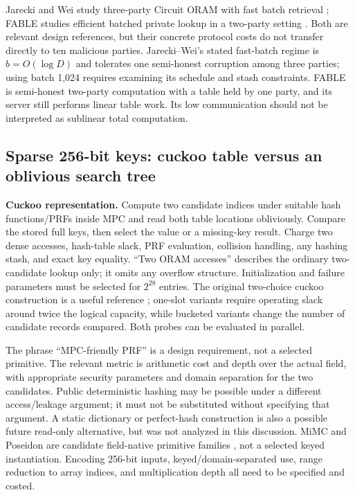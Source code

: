 \documentclass[11pt]{article}
\begin{document}
Jarecki and Wei study three-party Circuit ORAM with fast batch retrieval
\cite{jarecki2018}; FABLE studies efficient batched private lookup in a two-party
setting \cite{fable2025}. Both are relevant design references, but their concrete
protocol costs do not transfer directly to ten malicious parties.
Jarecki--Wei's stated fast-batch regime is $b=O(\log D)$ and tolerates one
semi-honest corruption among three parties; using batch 1,024 requires examining
its schedule and stash constraints. FABLE is semi-honest two-party computation
with a table held by one party, and its server still performs linear table work.
Its low communication should not be interpreted as sublinear total computation.

\subsection{Sparse 256-bit keys: cuckoo table versus an oblivious search tree}

\textbf{Cuckoo representation.} Compute two candidate indices under suitable
hash functions/PRFs inside MPC and read both table locations obliviously. Compare
the stored full keys, then select the value or a missing-key result. Charge two
dense accesses, hash-table slack, PRF evaluation, collision handling, any hashing
stash, and exact key equality. ``Two ORAM accesses'' describes the ordinary
two-candidate lookup only; it omits any overflow structure. Initialization and
failure parameters must be selected for $2^{28}$ entries.
The original two-choice cuckoo construction is a useful reference
\cite{cuckoo2004}; one-slot variants require operating slack around twice the
logical capacity, while bucketed variants change the number of candidate
records compared. Both probes can be evaluated in parallel.

The phrase ``MPC-friendly PRF'' is a design requirement, not a selected primitive.
The relevant metric is arithmetic cost and depth over the actual field, with
appropriate security parameters and domain separation for the two candidates.
Public deterministic hashing may be possible under a different access/leakage
argument; it must not be substituted without specifying that argument. A static
dictionary or perfect-hash construction is also a possible future read-only
alternative, but was not analyzed in this discussion.
MiMC and Poseidon are candidate field-native primitive families
\cite{mimc2016,poseidon2021}, not a selected keyed instantiation. Encoding
256-bit inputs, keyed/domain-separated use, range reduction to array indices,
and multiplication depth all need to be specified and costed.
\end{document}
